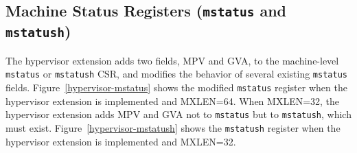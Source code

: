 \subsection{Machine Status Registers ({\tt mstatus} and {\tt mstatush})}

The hypervisor extension adds two fields, MPV and GVA, to the
machine-level {\tt mstatus} or {\tt mstatush} CSR, and modifies the
behavior of several existing {\tt mstatus} fields.
Figure~\ref{hypervisor-mstatus} shows the modified {\tt mstatus} register
when the hypervisor extension is implemented and MXLEN=64.
When MXLEN=32, the hypervisor extension adds MPV and GVA not to {\tt mstatus}
but to {\tt mstatush}, which must exist.
Figure~\ref{hypervisor-mstatush} shows the {\tt mstatush} register when
the hypervisor extension is implemented and MXLEN=32.

